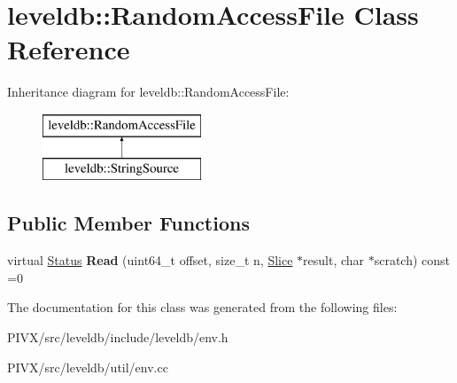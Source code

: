 \hypertarget{classleveldb_1_1_random_access_file}{}\section{leveldb\+:\+:Random\+Access\+File Class Reference}
\label{classleveldb_1_1_random_access_file}
Inheritance diagram for leveldb\+:\+:Random\+Access\+File\+:\begin{figure}[H]
\begin{center}
\leavevmode
\includegraphics[height=2.000000cm]{classleveldb_1_1_random_access_file}
\end{center}
\end{figure}
\subsection*{Public Member Functions}
\begin{DoxyCompactItemize}
\item 
\mbox{\label{classleveldb_1_1_random_access_file_a1a09fadcec904d9791a968acabca98d0}} 
virtual \mbox{\hyperlink{classleveldb_1_1_status}{Status}} {\bfseries Read} (uint64\+\_\+t offset, size\+\_\+t n, \mbox{\hyperlink{classleveldb_1_1_slice}{Slice}} $\ast$result, char $\ast$scratch) const =0
\end{DoxyCompactItemize}


The documentation for this class was generated from the following files\+:\begin{DoxyCompactItemize}
\item 
P\+I\+V\+X/src/leveldb/include/leveldb/env.\+h\item 
P\+I\+V\+X/src/leveldb/util/env.\+cc\end{DoxyCompactItemize}
